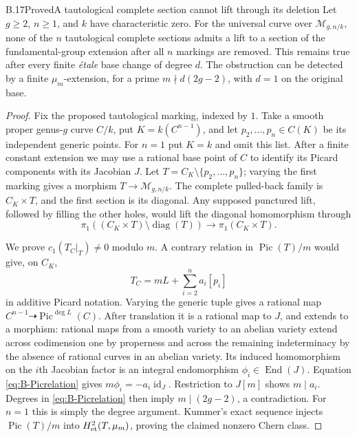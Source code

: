 \begin{statement}{B.17}{Proved}{A tautological complete section cannot lift through its deletion}
Let $g\geq2$, $n\geq1$, and $k$ have characteristic zero.  For the
universal curve over $\mathcal M_{g,n/k}$, none of the $n$ tautological
complete sections admits a lift to a section of the fundamental-group
extension after all $n$ markings are removed.  This remains true
after every finite \emph{\'etale} base change of degree $d$.
The obstruction can be detected by a finite $\mu_m$-extension,
for a prime $m\nmid d(2g-2)$, with $d=1$ on the original base.
\end{statement}
\begin{proof}
Fix the proposed tautological marking, indexed by $1$.  Take a smooth
proper genus-$g$ curve $C/k$, put
$K=k(C^{n-1})$, and let $p_2,\ldots,p_n\in C(K)$ be its independent
generic points.  For $n=1$ put $K=k$ and omit this list.  After a
finite constant extension we may use a rational base point of $C$
to identify its Picard components with its Jacobian $J$.
Let $T=C_K\setminus\{p_2,\ldots,p_n\}$; varying the first marking
gives a morphism $T\to\mathcal M_{g,n/k}$.  The complete pulled-back
family is $C_K\times T$, and the first section is its diagonal.
Any supposed punctured lift, followed by filling the other holes,
would lift the diagonal homomorphism through
\[
 \pi_1((C_K\times T)\setminus\operatorname{diag}(T))
 \longrightarrow\pi_1(C_K\times T).
\]

We prove $c_1(T_C|_T)\ne0$ modulo $m$.  A contrary relation in
$\operatorname{Pic}(T)/m$ would give, on $C_K$,
\[
 T_C=mL+\sum_{i=2}^n a_i[p_i]
 \tag{B.1}\label{eq:B-Picrelation}
\]
in additive Picard notation.  Varying the generic tuple gives a
rational map $C^{n-1}\dashrightarrow\operatorname{Pic}^{\deg L}(C)$.
After translation it is a rational map to $J$, and extends to a
morphism: rational maps from a smooth variety to an abelian variety
extend across codimension one by properness and across the remaining
indeterminacy by the absence of rational curves in an abelian variety.
Its induced homomorphism on the $i$th Jacobian factor is an integral
endomorphism $\phi_i\in\operatorname{End}(J)$.
Equation \eqref{eq:B-Picrelation} gives
$m\phi_i=-a_i\operatorname{id}_J$.  Restriction to $J[m]$ shows
$m\mid a_i$.  Degrees in \eqref{eq:B-Picrelation} then imply
$m\mid(2g-2)$, a contradiction.  For $n=1$ this is simply the degree
argument.  Kummer's exact sequence injects
$\operatorname{Pic}(T)/m$ into $H^2_{\rm et}(T,\mu_m)$, proving the
claimed nonzero Chern class.


\end{proof}

